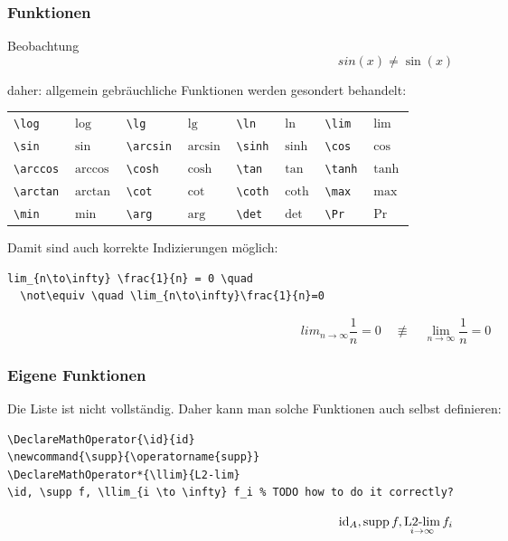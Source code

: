 \begin{frame}[fragile]
  \frametitle{Funktionen}

  \onslide<+->

  \begin{block}{Beobachtung}
    \vspace*{-\baselineskip}
    \begin{equation*}
      sin(x) \neq \sin(x)
    \end{equation*}
  \end{block}

  \onslide<+->

  daher: allgemein gebräuchliche Funktionen werden gesondert behandelt:

  \smallskip

  \begin{center}
    \begin{tabular}{ll|ll|ll|ll}
      \toprule
      \lstinline!\log! & $\log$ & \lstinline!\lg! & $\lg$ & \lstinline!\ln! & $\ln$ & \lstinline!\lim! & $\lim$ \\
      \lstinline!\sin! & $\sin$ & \lstinline!\arcsin! & $\arcsin$ & \lstinline!\sinh! & $\sinh$ & \lstinline!\cos! & $\cos$ \\
      \lstinline!\arccos! & $\arccos$ & \lstinline!\cosh! & $\cosh$ & \lstinline!\tan! & $\tan$ & \lstinline!\tanh! & $\tanh$ \\
      \lstinline!\arctan! & $\arctan$ & \lstinline!\cot! & $\cot$ & \lstinline!\coth! & $\coth$ & \lstinline!\max! & $\max$ \\
      \lstinline!\min! & $\min$  & \lstinline!\arg! & $\arg$ & \lstinline!\det! & $\det$  & \lstinline!\Pr! & $\Pr$ \\
      \bottomrule
    \end{tabular}
  \end{center}

  \smallskip

  \onslide<+->

  Damit sind auch korrekte Indizierungen möglich:
\begin{lstlisting}
lim_{n\to\infty} \frac{1}{n} = 0 \quad
  \not\equiv \quad \lim_{n\to\infty}\frac{1}{n}=0
\end{lstlisting}
  \begin{equation*}
    lim_{n\to\infty} \frac{1}{n} = 0 \quad \not\equiv \quad \lim_{n\to\infty}\frac{1}{n}=0
  \end{equation*}
\end{frame}

\begin{frame}[fragile]
  \frametitle{Eigene Funktionen}
  Die Liste ist nicht vollständig. Daher kann man solche Funktionen auch selbst definieren:
\begin{lstlisting}
\DeclareMathOperator{\id}{id}
\newcommand{\supp}{\operatorname{supp}}
\DeclareMathOperator*{\llim}{L2-lim}
\id, \supp f, \llim_{i \to \infty} f_i % TODO how to do it correctly?
\end{lstlisting}

  \begin{equation*}
    \id_A, \supp f, \llim_{i \to \infty} f_i
  \end{equation*}
\end{frame}

